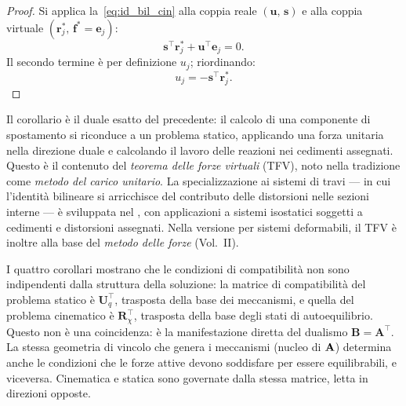 \begin{proof}
	Si applica la~\eqref{eq:id_bil_cin} alla coppia reale
	$(\bm{u},\,\bm{s})$ e alla coppia virtuale
	$(\bm{r}^*_j,\,\bm{f}^* = \bm{e}_j)$:
	\begin{equation}
		\bm{s}^{\top}\bm{r}^*_j +
		\bm{u}^{\top}\bm{e}_j = 0.
	\end{equation}
	Il secondo termine è per definizione $u_j$;
	riordinando:
	\begin{equation}
		u_j = -\bm{s}^{\top}\bm{r}^*_j. 
	\end{equation}
\end{proof}

\begin{oss}
	Il corollario è il duale esatto del precedente:
	il calcolo di una componente di spostamento si
	riconduce a un problema statico, applicando una
	forza unitaria nella direzione duale e calcolando
	il lavoro delle reazioni nei cedimenti assegnati.
	Questo è il contenuto del \emph{teorema delle forze
		virtuali} (TFV), noto nella tradizione come
	\emph{metodo del carico unitario}. La specializzazione
	ai sistemi di travi --- in cui l'identità bilineare si
	arricchisce del contributo delle distorsioni nelle
	sezioni interne --- è sviluppata nel
	, con applicazioni a sistemi
	isostatici soggetti a cedimenti e distorsioni
	assegnati. Nella versione per sistemi deformabili,
	il TFV è inoltre alla base del \emph{metodo delle
		forze} (Vol.~II).
\end{oss}


\begin{oss}
	I quattro corollari mostrano che le condizioni di
	compatibilità non sono indipendenti dalla struttura
	della soluzione: la matrice di compatibilità del
	problema statico è $\bm{U}_q^{\top}$, trasposta
	della base dei meccanismi, e quella del problema
	cinematico è $\bm{R}_\chi^{\top}$, trasposta della
	base degli stati di autoequilibrio. Questo non è una
	coincidenza: è la manifestazione diretta del dualismo
	$\bm{B} = \bm{A}^{\top}$. La stessa geometria di
	vincolo che genera i meccanismi (nucleo di $\mathbf{A}$)
	determina anche le condizioni che le forze attive
	devono soddisfare per essere equilibrabili, e
	viceversa. Cinematica e statica sono governate dalla
	stessa matrice, letta in direzioni opposte.
\end{oss}


